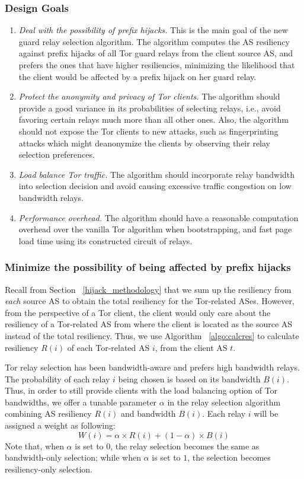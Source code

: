 \subsubsection{Design Goals}
\begin{enumerate}
\item \emph{Deal with the possibility of prefix hijacks.} This is the main goal of the new guard relay selection algorithm. The algorithm computes the AS resiliency against prefix hijacks of all Tor guard relays from the client source AS, and prefers the ones that have higher resiliencies, minimizing the likelihood that the client would be affected by a prefix hijack on her guard relay. 
\item \emph{Protect the anonymity and privacy of Tor clients.} The algorithm should provide a good variance in its probabilities of selecting relays, i.e., avoid favoring certain relays much more than all other ones. Also, the algorithm should not expose the Tor clients to new attacks, such as fingerprinting attacks which might deanonymize the clients by observing their relay selection preferences. 
\item \emph{Load balance Tor traffic.} The algorithm should incorporate relay bandwidth into selection decision and avoid causing excessive traffic congestion on low bandwidth relays. 
\item \emph{Performance overhead.} The algorithm should have a reasonable computation overhead over the vanilla Tor algorithm when bootstrapping, and fast page load time using its constructed circuit of relays. 
\end{enumerate}

\subsubsection{Minimize the possibility of being affected by prefix hijacks}

Recall from Section ~\ref{hijack_methodology} that we sum up the resiliency from \emph{each} source AS to obtain the total resiliency for the Tor-related ASes. However, from the perspective of a Tor client, the client would only care about the resiliency of a Tor-related AS from where the client is located as the source AS instead of the total resiliency. Thus, we use Algorithm ~\ref{algo:calcres} to calculate resiliency $R(i)$ of each Tor-related AS $i$, from the client AS $t$. 

Tor relay selection has been bandwidth-aware and prefers high bandwidth relays. The probability of each relay $i$ being chosen is based on its bandwidth $B(i)$. Thus, in order to still provide clients with the load balancing option of Tor bandwidths, we offer a tunable parameter $\alpha$ in the relay selection algorithm combining AS resiliency $R(i)$ and bandwidth $B(i)$. Each relay $i$ will be assigned a weight as following:
\begin{equation*}
W(i) = \alpha \times R(i) + (1 - \alpha) \times B(i)
\end{equation*}
Note that, when $\alpha$ is set to $0$, the relay selection becomes the same as bandwidth-only selection; while when $\alpha$ is set to $1$, the selection becomes resiliency-only selection. 

